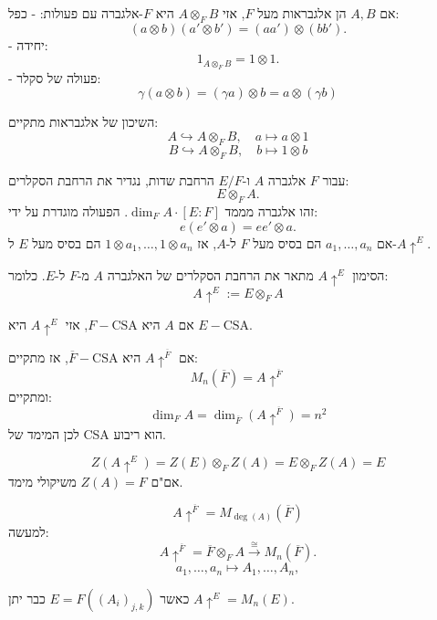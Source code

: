 \documentclass{tstextbook}
\begin{document}
\begin{definition}
אם \(A, B\) הן אלגבראות מעל \(F\), אזי \(A \otimes_{F} B\) היא \(F\)-אלגברה עם פעולות:
- כפל:
$$(a \otimes b)(a' \otimes b') = (aa') \otimes (bb').$$
- יחידה: $$1_{A \otimes_{F} B} = 1 \otimes 1.$$
- פעולה של סקלר:
$$\gamma(a \otimes b) = (\gamma a) \otimes b = a \otimes (\gamma b)$$

\end{definition}
\begin{proposition}
השיכון של אלגבראות מתקיים:
$$A \hookrightarrow A \otimes_{F} B, \quad a \mapsto a \otimes 1$$$$B \hookrightarrow A \otimes_{F} B, \quad b \mapsto 1 \otimes b$$

\end{proposition}
\begin{definition}
עבור \(F\) אלגברה \(A\) ו-\(E / F\) הרחבת שדות, נגדיר את הרחבת הסקלרים:
$$E \otimes_{F} A.$$
זהו אלגברה מממד \(\dim_{F} A \cdot [E : F]\). הפעולה מוגדרת על ידי:
$$e(e' \otimes a) = e e' \otimes a.$$
אם \(a_{1}, \dots, a_{n}\) הם בסיס מעל \(F\) ל-\(A\), אז \(1 \otimes a_{1}, \dots, 1 \otimes a_{n}\) הם בסיס מעל \(E\) ל-\(A\uparrow^{E}\).

\end{definition}
\begin{symbolize}
הסימון \(A\uparrow^{E}\) מתאר את הרחבת הסקלרים של האלגברה \(A\) מ-\(F\) ל-\(E\). כלומר:
$$A\uparrow^{E} := E \otimes_{F} A$$

\end{symbolize}
\begin{proposition}
אם \(A\) היא \(F-\mathrm{CSA}\), אזי \(A\uparrow^{E}\) היא \(E-\mathrm{CSA}\).

\end{proposition}
\begin{corollary}
אם \(A\uparrow^{\overline{F}}\) היא \(\overline{F}-\mathrm{CSA}\), אז מתקיים:
$$M_{n}(\overline{F}) = A\uparrow^{\overline{F}}$$
ומתקיים:
$$\dim_{F} A = \dim_{\overline{F}} (A\uparrow^{\overline{F}}) = n^{2}$$
לכן המימד של CSA הוא ריבוע.

\end{corollary}
\begin{corollary}
$$Z(A\uparrow^{E}) = Z(E) \otimes_{F} Z(A) = E \otimes_{F} Z(A) = E$$
אם"ם \(Z(A) = F\) משיקולי מימד.

\end{corollary}
\begin{corollary}
$$A\uparrow^{\overline{F}} = M_{\deg(A)}(\overline{F})$$
למעשה:
$$A\uparrow^{\overline{F}} = \overline{F} \otimes_{F} A \xrightarrow{\cong} M_{n}(\overline{F}).$$$$a_{1}, \dots, a_{n} \mapsto A_{1}, \dots, A_{n},$$

\end{corollary}
כאשר \(E = F((A_{i})_{j,k})\) כבר יתן \(A\uparrow^{E} = M_{n}(E)\).
\end{document}
